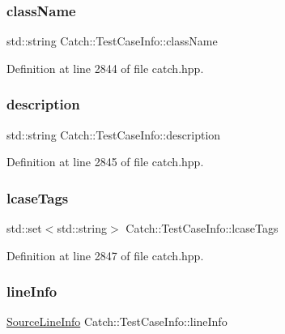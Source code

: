 \subsubsection{\texorpdfstring{class\+Name}{className}}
{\footnotesize\ttfamily std\+::string Catch\+::\+Test\+Case\+Info\+::class\+Name}



Definition at line 2844 of file catch.\+hpp.

\hypertarget{struct_catch_1_1_test_case_info_a37fe2db9425bc45f6a33893eac31198e}{}\label{struct_catch_1_1_test_case_info_a37fe2db9425bc45f6a33893eac31198e} 
\subsubsection{\texorpdfstring{description}{description}}
{\footnotesize\ttfamily std\+::string Catch\+::\+Test\+Case\+Info\+::description}



Definition at line 2845 of file catch.\+hpp.

\hypertarget{struct_catch_1_1_test_case_info_a0ed3864a313e8ddc3ae38431be5be9ae}{}\label{struct_catch_1_1_test_case_info_a0ed3864a313e8ddc3ae38431be5be9ae} 
\subsubsection{\texorpdfstring{lcase\+Tags}{lcaseTags}}
{\footnotesize\ttfamily std\+::set$<$std\+::string$>$ Catch\+::\+Test\+Case\+Info\+::lcase\+Tags}



Definition at line 2847 of file catch.\+hpp.

\hypertarget{struct_catch_1_1_test_case_info_aa9407b7f442655b51a2aad24b3fa2fd3}{}\label{struct_catch_1_1_test_case_info_aa9407b7f442655b51a2aad24b3fa2fd3} 
\subsubsection{\texorpdfstring{line\+Info}{lineInfo}}
{\footnotesize\ttfamily \hyperlink{struct_catch_1_1_source_line_info}{Source\+Line\+Info} Catch\+::\+Test\+Case\+Info\+::line\+Info}



